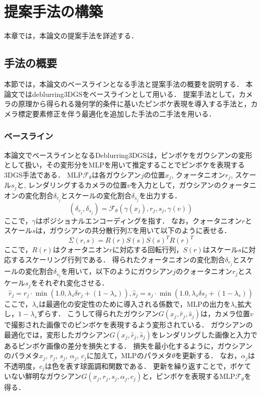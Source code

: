 \section{提案手法の構築}\label{sec:method_creation}
本章では，本論文の提案手法を詳述する．

\subsection{手法の概要}\label{subsec:method_outline}
本節では，本論文のベースラインとなる手法と提案手法の概要を説明する．
本論文ではdeblurring3DGS\cite{Deblurring3dgs}をベースラインとして用いる．
提案手法として，カメラの原理から得られる幾何学的条件に基いたピンボケ表現を導入する手法と，カメラ標定要素修正を伴う最適化を追加した手法の二手法を用いる．
\subsubsection*{ベースライン}
本論文でベースラインとなるDeblurring3DGS\cite{Deblurring3dgs}は，ピンボケをガウシアンの変形として扱い，その変形分をMLPを用いて推定することでピンボケを表現する3DGS手法である．
MLP$\mathcal{F}_\theta$は各ガウシアン$j$の位置$x_j$, クォータニオン$r_j$, スケール$s_j$と, レンダリングするカメラの位置$v$を入力として，ガウシアンのクォータニオンの変化割合$\delta_{r_j}$とスケールの変化割合$\delta_{s_j}$を出力する．
\begin{equation}
	(\delta_{r_j}, \delta_{s_j}) = \mathcal{F}_\theta(\gamma(x_j), r_j, s_j, \gamma(v))
\end{equation}
ここで，$\gamma$はポジショナルエンコーディングを指す．
なお，クォータニオン$r$とスケール$s$は，ガウシアンの共分散行列$\Sigma$を用いて以下のように表せる．
\begin{equation}
  \Sigma(r, s) = R(r)S(s){S(s)}^T{R(r)}^T
\end{equation}
ここで，$R(r)$はクォータニオン$r$に対応する回転行列，$S(r)$はスケール$s$に対応するスケーリング行列である\cite{rotation_quaternion}．
得られたクォータニオンの変化割合$\delta_{r_j}$とスケールの変化割合$\delta_{s_j}$を用いて，以下のようにガウシアン$j$のクォータニオン$r_j$とスケール$s_j$をそれぞれ変化させる．
\begin{equation}
	\hat{r}_j=r_j \cdot \min \left(1.0, \lambda_s \delta r_j+\left(1-\lambda_s\right)\right), 
	\hat{s}_j=s_j \cdot \min \left(1.0, \lambda_s \delta s_j+\left(1-\lambda_s\right)\right)
\end{equation}
ここで，$\lambda_s$は最適化の安定性のために導入される係数で，MLPの出力を$\lambda_s$拡大し，$1-\lambda_s$ずらす．
こうして得られたガウシアン$G(x_j, \hat{r}_j, \hat{s}_j)$は，カメラ位置$v$で撮影された画像でのピンボケを表現するよう変形されている．
ガウシアンの最適化では，変形したガウシアン$G(x_j, \hat{r}_j, \hat{s}_j)$をレンダリングした画像と入力であるピンボケ画像の差分を損失とする．
損失を最小化するように，ガウシアンのパラメタ$x_j$, $r_j$, $s_j$, $\alpha_j$, $c_j$に加えて，MLPのパラメタ$\theta$を更新する．
なお，$\alpha_j$は不透明度，$c_j$は色を表す球面調和関数である．
更新を繰り返すことで，ボケていない鮮明なガウシアン$G(x_j, r_j, s_j, \alpha_j, c_j)$と，ピンボケを表現するMLP$\mathcal{F}_\theta$を得る．\par
